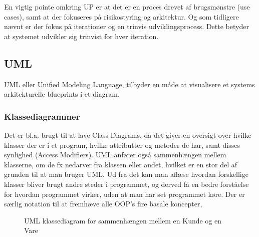 En vigtig pointe omkring UP er at det er en proces drevet af brugsmønstre (use cases), samt at der fokuseres på risikostyring og arkitektur. Og som tidligere nævnt er der fokus på iterationer og en trinvis udviklingsprocess. Dette betyder at systemet udvikler sig trinvist for hver iteration.


\subsection{UML}

UML eller Unified Modeling Language, tilbyder en måde at visualisere et systems arkitekturelle blueprints i et diagram. 

\subsubsection{Klassediagrammer}

Det er bl.a. brugt til at lave Class Diagrams, da det giver en oversigt over hvilke klasser der er i et program, hvilke attributter og metoder de har, samt disses synlighed (Access Modifiers). UML anfører også sammenhængen mellem klasserne, om de fx nedarver fra klassen eller andet, hvilket er en stor del af grunden til at man bruger UML.  Ud fra det kan man aflæse hvordan forskellige klasser bliver brugt andre steder i programmet, og derved få en bedre forståelse for hvordan programmet virker, uden at man har set programmet køre. Der er særlig notation til at fremhæve alle OOP's fire basale koncepter, 

\begin{wrapfigure}{r}{0.26\textwidth}
    \vspace{0cm}
  \caption{UML klassediagram for sammenhængen mellem en Kunde og en Vare}
  \label{fig:UML eksempel}
\end{wrapfigure}  

